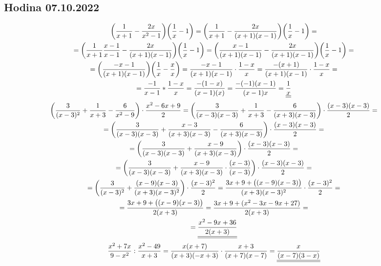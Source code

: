 \subsection*{Hodina 07.10.2022}
 \begin{gather*}
    \biggl( \frac{1}{x+1} - \frac{2x}{x^2-1} \biggr) \biggl(\frac{1}{x} - 1\biggr)
    =  \biggl( \frac{1}{ x+1} - \frac{2x}{(x+1)(x-1)}\biggr)\biggl(\frac{1}{x} -1 \biggr)
    = \\
    = \biggl( \frac{1}{x+1} \frac{x-1}{x-1} - \frac{2x}{(x+1)(x-1)} \biggr)  \biggl(\frac{1}{x}-1\biggr)
    = \biggl( \frac{x-1}{(x+1)(x-1)} - \frac{2x}{(x+1)(x-1)}\biggr) \biggl(\frac{1}{x} - 1\biggr) = 
    \\
    = \biggl(\frac{-x-1}{(x+1)(x-1)}\biggr)\biggl(\frac{1}{x} - \frac{x}{x}\biggr) 
    = \frac{-x-1}{(x+1)(x-1)} \cdot \frac{1 - x}{x}
    = \frac{-(x+1)}{(x+1)(x-1)} \cdot \frac{1-x}{x} =
    \\ = \frac{-1}{x-1} * \frac{1-x}{x} = \frac{-(1-x)}{(x-1)(x)} = \frac{-(-1)(x-1)}{(x-1)x} = \underline{\underline{\frac{1}{x}}}
\end{gather*}
\begin{gather*}
    \biggl( \frac{3}{(x-3)^2} + \frac{1}{x+3}- \frac{6}{x^2-9}\biggr) \cdot \frac{x^2-6x+9}{2}
    = \biggl( \frac{3}{(x-3)(x-3)} + \frac{1}{x+3} - \frac{6}{(x+3)(x-3)} \biggr) \cdot \frac{(x-3)(x-3)}{2} =
    \\ = \biggl(
    \frac{3}{(x-3)(x-3)} + \frac{x-3}{(x+3)(x-3)} - \frac{6}{(x+3)(x-3)}
    \biggr) \cdot \frac{(x-3)(x-3)}{2} = \\ = 
    \biggl(
        \frac{3}{(x-3)(x-3)} + \frac{x-9}{(x+3)(x-3)}
    \biggr) \cdot \frac{(x-3)(x-3)}{2} =
    \\ = \biggl(
        \frac{3}{(x-3)(x-3)} + \frac{x-9}{(x+3)(x-3)} \cdot \frac{(x-3)}{(x-3)}
    \biggr) \cdot \frac{(x-3)(x-3)}{2} = \\ =
     \biggl(
        \frac{3}{(x-3)^2} + \frac{(x-9)(x-3)}{(x+3)(x-3)^2} 
    \biggr) \cdot \frac{(x-3)^2}{2} = \frac{3x+9+\bigl((x-9)(x-3)\bigr)}{(x+3)(x-3)^2} \cdot \frac{(x-3)^2}{2} =
    \\ = \frac{3x+9+\bigl((x-9)(x-3)\bigr)}{2(x+3)} = \frac{3x+9+(x^2-3x-9x+27)}{2(x+3)} = \\ =
    \underline{\underline{\frac{x^2-9x+36}{2(x+3)}}}
\end{gather*}
\begin{gather*}
    \frac{x^2+7x}{9-x^2} : \frac{x^2-49}{x+3} = \frac{x(x+7)}{(x+3)(-x+3)} \cdot \frac{x+3}{(x+7)(x-7)} = \underline{\underline{\frac{x}{(x-7)(3-x)}}}
\end{gather*}

